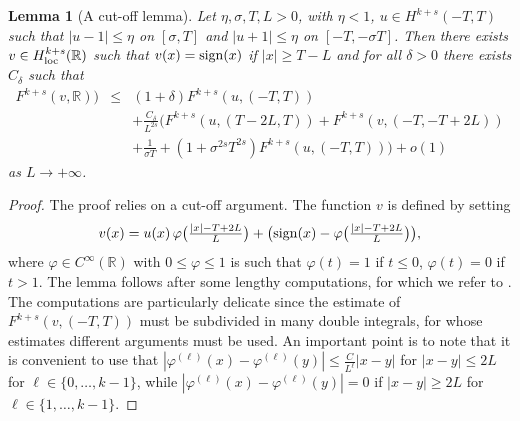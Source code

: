 \documentclass{article}
\newtheorem{lemma}{Lemma}%
\begin{document}
\begin{lemma}[A cut-off lemma]\label{culemma}
Let $\eta,\sigma,T,L>0$, with $\eta<1$, $u\in H^{k+s}(-T,T)$ such that $|u-1|\le \eta$ on $[\sigma,T]$ and $|u+1|\le \eta$ on $[-T,-\sigma T]$. Then there exists $v\in H^{k+s}_{\rm loc}(\mathbb R)$ such that $v(x)={\rm sign}(x)$ if $|x|\ge T-L$ and for all $\delta>0$ there exists $C_\delta$ such that
\begin{eqnarray}\label{lemma-co}\nonumber
F^{k+s}(v,\mathbb R))&\le& (1+\delta) F^{k+s}(u,(-T,T))\\ \nonumber
&&+ \frac{C_\delta}{L^{2s}}\Big(F^{k+s}(u,(T-2L,T))
+ F^{k+s}(v,(-T,-T+2L))\\
&&+\frac1{\sigma T}+(1+\sigma^{2s} T^{2s})F^{k+s}(u,(-T,T))\Big) +o(1)
\end{eqnarray}
as $L\to+\infty$.
\end{lemma}

\begin{proof}
The proof relies on a cut-off argument. The function $v$ is defined by setting
$$
v(x)= u(x)\,\varphi\big(\tfrac{|x|-T+2L}L\big)+\big({\rm sign}(x)-\varphi\big(\tfrac{|x|-T+2L}L\big)\big),
$$
where $\varphi\in C^\infty(\mathbb R)$ with $0\le \varphi\le 1$ is such that $\varphi(t)=1$ if $t\le 0$, $\varphi(t)=0$ if $t>1$. 
The lemma follows after some lengthy computations, for which we refer to \cite[Proposition 12]{Solci}.  The computations are particularly delicate since the estimate of $F^{k+s}(v,(-T,T))$ must be subdivided in many double integrals, for whose estimates different arguments must be used. An important point is to note that it is convenient to use that $|\varphi^{(\ell)}(x)-\varphi^{(\ell)}(y)|\le \frac{C}{L^\ell}|x-y|$ for $|x-y|\le 2L$ for $\ell\in\{0,\ldots, k-1\}$, while $|\varphi^{(\ell)}(x)-\varphi^{(\ell)}(y)|=0$ if $|x-y|\ge 2L$ for $\ell\in\{1,\ldots, k-1\}$.
\end{proof}
\end{document}
